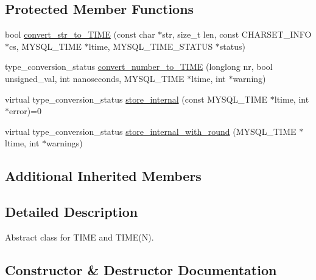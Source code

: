 \subsection*{Protected Member Functions}
\begin{DoxyCompactItemize}
\item 
bool \mbox{\hyperlink{classField__time__common_acfef2451ff4e62d79823fec4c14750be}{convert\+\_\+str\+\_\+to\+\_\+\+T\+I\+ME}} (const char $\ast$str, size\+\_\+t len, const C\+H\+A\+R\+S\+E\+T\+\_\+\+I\+N\+FO $\ast$cs, M\+Y\+S\+Q\+L\+\_\+\+T\+I\+ME $\ast$ltime, M\+Y\+S\+Q\+L\+\_\+\+T\+I\+M\+E\+\_\+\+S\+T\+A\+T\+US $\ast$status)
\item 
type\+\_\+conversion\+\_\+status \mbox{\hyperlink{classField__time__common_ab30cf710ffb3f033da46e5e43430490d}{convert\+\_\+number\+\_\+to\+\_\+\+T\+I\+ME}} (longlong nr, bool unsigned\+\_\+val, int nanoseconds, M\+Y\+S\+Q\+L\+\_\+\+T\+I\+ME $\ast$ltime, int $\ast$warning)
\item 
virtual type\+\_\+conversion\+\_\+status \mbox{\hyperlink{classField__time__common_a86071ced0943d9626dd07e2cdf387875}{store\+\_\+internal}} (const M\+Y\+S\+Q\+L\+\_\+\+T\+I\+ME $\ast$ltime, int $\ast$error)=0
\item 
virtual type\+\_\+conversion\+\_\+status \mbox{\hyperlink{classField__time__common_af094223508c3096845af6a1d95caa82c}{store\+\_\+internal\+\_\+with\+\_\+round}} (M\+Y\+S\+Q\+L\+\_\+\+T\+I\+ME $\ast$ltime, int $\ast$warnings)
\end{DoxyCompactItemize}
\subsection*{Additional Inherited Members}


\subsection{Detailed Description}
Abstract class for T\+I\+ME and T\+I\+M\+E(\+N). 

\subsection{Constructor \& Destructor Documentation}
\mbox{\label{classField__time__common_a4dafe0dc9d97419ac274303c339bff04}} 
